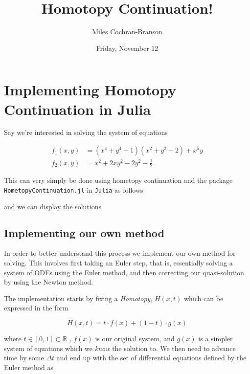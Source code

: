 \documentclass[11pt]{article}
\title{Homotopy Continuation!}
\author{Miles Cochran-Branson}
\date{Friday, November 12}
\begin{document}
    
\maketitle
  
\tableofcontents
    
    \hypertarget{implementing-homotopy-continuation-in-julia}{%
\section{Implementing Homotopy Continuation in
Julia}\label{implementing-homotopy-continuation-in-julia}}

Say we're interested in solving the system of equations

\[
\begin{split}
f_1(x, y) & = (x^4 + y^4 − 1)(x^2 + y^2 − 2) + x^5y \\
f_2(x, y) & = x^2 + 2xy^2 - 2y^2 - \frac{1}{2}. 
\end{split}
\]

This can very simply be done using hometopy continuation and the package
\texttt{HometopyContinuation.jl} in \texttt{Julia} as follows


        
    and we can display the solutions



    \hypertarget{implementing-our-own-method}{%
\subsection{Implementing our own
method}\label{implementing-our-own-method}}

In order to better understand this process we implement our own method
for solving. This involves first taking an Euler step, that is,
essentially solving a system of ODEs using the Euler method, and then
correcting our quasi-solution by using the Newton method.

The implementation starts by fixing a \emph{Homotopy}, \(H(x,t)\) which
can be expressed in the form

\[
    H(x,t) = t \cdot f(x) + (1 - t) \cdot g(x)
\]

where \(t \in [0,1] \subset \mathbb{R}\) , \(f(x)\) is our original
system, and \(g(x)\) is a simpler system of equations which we
\emph{know} the solution to. We then need to advance time by some
\(\Delta t\) and end up with the set of differential equations defined
by the Euler method as
\end{document}
